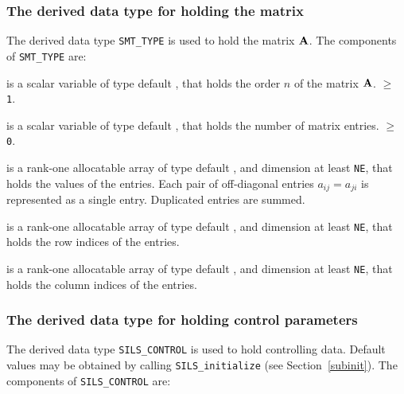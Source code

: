 \documentclass{galahad}
\newcommand{\packagename}{SILS}
\begin{document}

\subsubsection{The derived data type for holding the matrix}\label{typeprob}
The derived data type {\tt SMT\_TYPE} is used to hold the matrix ${\mathbf{A}}$. 
The components of {\tt SMT\_TYPE} are:

\begin{description}

 is a scalar variable of type default \integer, that holds
the order $n$ of the matrix  ${\mathbf{A}}$. 
 $\geq$ {\tt 1}. 

 is a scalar variable of type default \integer, that holds the 
number of matrix entries.  
 $\geq$ {\tt 0}.

 is a rank-one allocatable array of type default \realdp, 
and dimension at least {\tt NE}, that holds the values of the entries. 
Each pair of off-diagonal entries $a_{ij} = a_{ji} $ 
is represented as a single entry. Duplicated entries are summed. 

 is a rank-one allocatable array of type default \integer, 
and dimension at least {\tt NE}, that holds the row indices of the entries. 

 is a rank-one allocatable array of type default \integer, 
and dimension at least {\tt NE}, that holds the column indices of the entries. 

\end{description}


\subsubsection{The derived data type for holding control 
 parameters}\label{typecontrol}
The derived data type 
{\tt \packagename\_CONTROL} 
is used to hold controlling data. Default values may be obtained by calling 
{\tt \packagename\_initialize}
(see Section~\ref{subinit}). The components of 
{\tt \packagename\_CONTROL} 
are:
\end{document}
